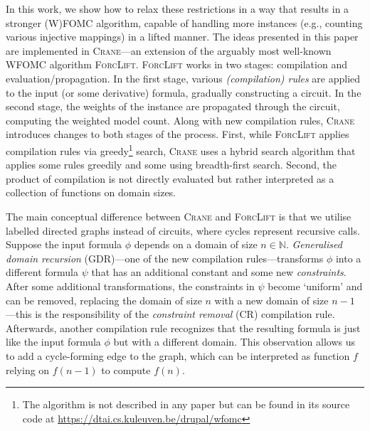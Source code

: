 \documentclass{article}
\theoremstyle{definition}
\begin{document}


In this work, we show how to relax these restrictions in a way that results in a
stronger (W)FOMC algorithm, capable of handling more instances (e.g., counting
various injective mappings) in a lifted manner. The ideas presented in this
paper are implemented in \textsc{Crane}---an extension of the arguably most
well-known WFOMC algorithm \textsc{ForcLift}. \textsc{ForcLift} works in two
stages: compilation and evaluation/propagation. In the first stage, various
\emph{(compilation) rules} are applied to the input (or some derivative)
formula, gradually constructing a circuit. In the second stage, the weights of
the instance are propagated through the circuit, computing the weighted model
count. Along with new compilation rules, \textsc{Crane} introduces changes to
both stages of the process. First, while \textsc{ForcLift} applies compilation
rules via greedy\footnote{The algorithm is not described in any paper but can be
  found in its source code at \url{https://dtai.cs.kuleuven.be/drupal/wfomc}}
search, \textsc{Crane} uses a hybrid search algorithm that applies some rules
greedily and some using breadth-first search. Second, the product of compilation
is not directly evaluated but rather interpreted as a collection of functions on
domain sizes.



The main conceptual difference between \textsc{Crane} and \textsc{ForcLift} is
that we utilise labelled directed graphs instead of circuits, where cycles
represent recursive calls. Suppose the input formula $\phi$ depends on a domain
of size $n \in \mathbb{N}$. \emph{Generalised domain recursion} (GDR)---one of
the new compilation rules---transforms $\phi$ into a different formula $\psi$
that has an additional constant and some new \emph{constraints}. After some
additional transformations, the constraints in $\psi$ become `uniform' and can
be removed, replacing the domain of size $n$ with a new domain of size
$n-1$---this is the responsibility of the \emph{constraint removal} (CR)
compilation rule. Afterwards, another compilation rule recognizes that the
resulting formula is just like the input formula $\phi$ but with a different
domain. This observation allows us to add a cycle-forming edge to the graph,
which can be interpreted as function $f$ relying on $f(n-1)$ to compute $f(n)$.
\end{document}

